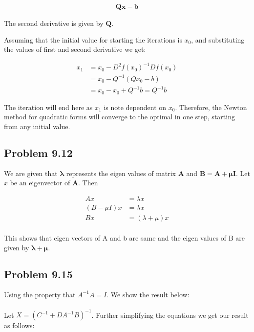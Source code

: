 \documentclass[letterpaper,12pt]{article}
\theoremstyle{definition}
\begin{document}
\begin{align*}
   \mathbf{Qx-b}
\end{align*}

\begin{flushleft}
The second derivative is given by $\mathbf{Q}$.

\vspace{2mm}

Assuming that the initial value for starting the iterations is $x_0$, and substituting the values of first and second derivative we get:
\end{flushleft}

\begin{align*}
x_1 &= x_0 - D^2f(x_0)^{-1}Df(x_0) \\
&= x_0 - Q^{-1} (Qx_0 - b) \\
&= x_0 - x_0 + Q^{-1}b = Q^{-1}b
\end{align*}


\begin{flushleft}
The iteration will end here as $x_1$ is note dependent on $x_0$. Therefore, the Newton method for quadratic forms will converge to the optimal in one step, starting from any initial value.
\end{flushleft}


\subsection*{Problem 9.12}

We are given that $\mathbf{\lambda}$ represents the eigen values of matrix $\mathbf{A}$ and $\mathbf{B = A+ \mathbf{\mu} I}$. Let $x$ be an eigenvector of $\mathbf{A}$. Then

\begin{align*}
 Ax &=\lambda x  \\
 (B - \mu I)x &= \lambda x  \\
 Bx &= (\lambda + \mu)x  \\
\end{align*}

\begin{flushleft}
This shows that eigen vectors of A and b are same and the eigen values of B are given by $\mathbf{\lambda + \mu}$.
\end{flushleft}
\subsection*{Problem 9.15}
\begin{flushleft}
Using the property that $A^{-1}A = I$. We show the result below:\\\\
\vspace{2mm}
Let $X = (C^{-1} + DA^{-1}B)^{-1}$. Further simplifying the equations we get our result as follows: 
\end{flushleft}
\end{document}
